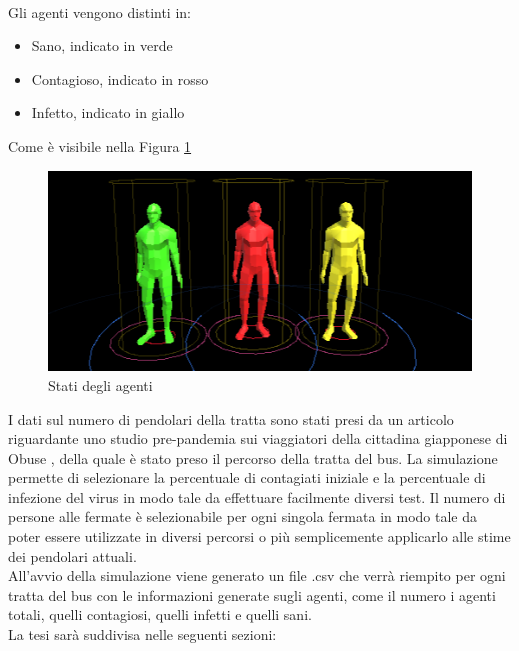 \documentclass[12pt, openany]{book}
\begin{document}
		\\Gli agenti vengono distinti in:
		\begin{itemize}
			\item Sano, indicato in verde
			\item Contagioso, indicato in rosso
			\item Infetto, indicato in giallo
			
		\end{itemize} 
		Come è visibile nella Figura \ref{fig:agenti}
	\begin{figure}[H]
		\centering
		\includegraphics[width=1\linewidth]{"Immagini/Agenti"}
		\caption{Stati degli agenti}
		\label{fig:agenti}
	\end{figure}		
		I dati sul numero di pendolari della tratta sono stati presi da un articolo riguardante uno studio pre-pandemia sui viaggiatori della cittadina giapponese di Obuse \cite{Obuse}, della quale è stato preso il percorso della tratta del bus. La simulazione permette di selezionare la percentuale di contagiati iniziale e la percentuale di infezione del virus in modo tale da effettuare facilmente diversi test. Il numero di persone alle fermate è selezionabile per ogni singola fermata in modo tale da poter essere utilizzate in diversi percorsi o più semplicemente applicarlo alle stime dei pendolari attuali.\\
		All'avvio della simulazione viene generato un file .csv che verrà riempito per ogni tratta del bus con le informazioni generate sugli agenti, come il numero i agenti totali, quelli contagiosi, quelli infetti e quelli sani.
		\\
		La tesi sarà suddivisa nelle seguenti sezioni:
\end{document}
